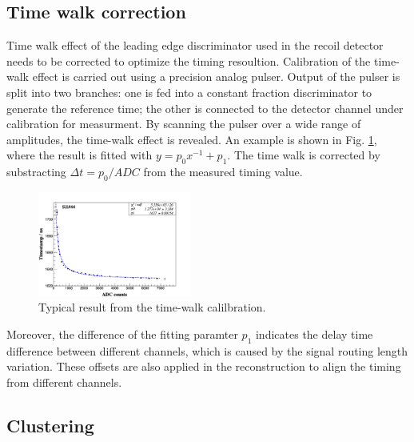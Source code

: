 \documentclass[number,5p]{elsarticle}
\begin{document}
\subsection{Time walk correction}
\label{sec:timewalk}

Time walk effect of the leading edge discriminator used in the recoil detector needs to be corrected to
optimize the timing resoultion.
Calibration of the time-walk effect is carried out using a  precision analog pulser. 
Output of the pulser is split into two branches: one is fed into a constant fraction discriminator to generate the reference time;
the other is connected to the detector channel under calibration for measurment. 
By scanning the pulser over a wide range of amplitudes, the time-walk effect is
revealed.
An example is shown in Fig. \ref{fig:timewalk}, where the result is fitted with \(y=p_0 x^{-1} + p_1\). 
The time walk is corrected by substracting \(\Delta t = p_0/ADC\) from the
measured timing value.

\begin{figure}[htbp]
  \centering
  \includegraphics[width=0.45\textwidth]{./timewalk.png}
  \caption{Typical result from the time-walk calilbration.}
  \label{fig:timewalk}
\end{figure}

Moreover, the difference of the fitting paramter \(p_1\) indicates the delay time
difference between different channels, which is caused by the signal routing length variation.
These offsets are also applied in the reconstruction to align the timing from different channels.

\subsection{Clustering}
\label{clustering}
\end{document}
